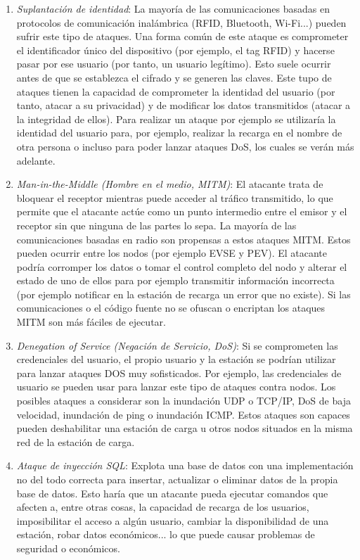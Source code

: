 \documentclass[12pt,a4paper,onecolumn,oneside]{report}
\begin{document}
\begin{enumerate}

\item \textit{Suplantación de identidad}: La mayoría de las comunicaciones basadas en protocolos de comunicación inalámbrica (RFID, Bluetooth, Wi-Fi...) pueden sufrir este tipo de ataques. Una forma común de este ataque es comprometer el identificador único del dispositivo (por ejemplo, el tag RFID) y hacerse pasar por ese usuario (por tanto, un usuario legítimo). Esto suele ocurrir antes de que se establezca el cifrado y se generen las claves. Este tupo de ataques tienen la capacidad de comprometer la identidad del usuario (por tanto, atacar a su privacidad) y de modificar los datos transmitidos (atacar a la integridad de ellos). Para realizar un ataque por ejemplo se utilizaría la identidad del usuario para, por ejemplo, realizar la recarga en el nombre de otra persona o incluso para poder lanzar ataques DoS, los cuales se verán más adelante.

\item \textit{Man-in-the-Middle (Hombre en el medio, MITM)}:  El atacante trata de bloquear el receptor mientras puede acceder al tráfico transmitido, lo que permite que el atacante actúe como un punto intermedio entre el emisor y el receptor sin que ninguna de las partes lo sepa. La mayoría de las comunicaciones basadas en radio son propensas a estos ataques MITM. Estos pueden ocurrir entre los nodos (por ejemplo EVSE y PEV). El atacante podría corromper los datos o tomar el control completo del nodo y alterar el estado de uno de ellos para por ejemplo transmitir información incorrecta (por ejemplo notificar en la estación de recarga un error que no existe). Si las comunicaciones o el código fuente no se ofuscan o encriptan los ataques MITM son más fáciles de ejecutar.

\item \textit{Denegation of Service (Negación de Servicio, DoS)}: Si se comprometen las credenciales del usuario, el propio usuario y la estación se podrían utilizar para lanzar ataques DOS muy sofisticados. Por ejemplo, las credenciales de usuario se pueden usar para lanzar este tipo de ataques contra nodos. Los posibles ataques a considerar son la inundación UDP o TCP/IP, DoS de baja velocidad, inundación de ping o inundación ICMP. Estos ataques son capaces pueden deshabilitar una estación de carga u otros nodos situados en la misma red de la estación de carga.

\item \textit{Ataque de inyección SQL}: Explota una base de datos con una implementación no del todo correcta para insertar, actualizar o eliminar datos de la propia base de datos. Esto haría que un atacante pueda ejecutar comandos que afecten a, entre otras cosas, la capacidad de recarga de los usuarios, imposibilitar el acceso a algún usuario, cambiar la disponibilidad de una estación, robar datos económicos... lo que puede causar problemas de seguridad o económicos.


\end{enumerate}
\end{document}
